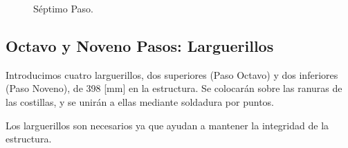 \begin{figure}[!htb]
\centering
{}
\caption{Séptimo Paso. \label{fig:sept}}
\end{figure}


\subsection{Octavo y Noveno Pasos: Larguerillos}
Introducimos cuatro larguerillos, dos superiores (Paso Octavo) y dos inferiores (Paso Noveno), de 398 [mm] en la estructura. Se colocarán sobre las ranuras de las costillas, y se unirán a ellas mediante soldadura por puntos.

Los larguerillos son necesarios ya que ayudan a mantener la integridad de la estructura.

